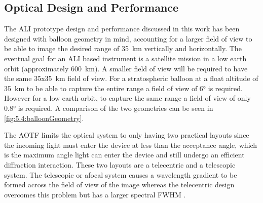 \documentclass[12pt]{article}
\begin{document}
\subsection{Optical Design and Performance}

The ALI prototype design and performance discussed in this work has been designed with balloon geometry in mind, accounting for a larger field of view to be able to image the 
desired range of 35~km vertically and horizontally. The eventual goal for an ALI based instrument is a satellite mission in a low earth orbit (approximately 600~km). A smaller 
field of view will be required to have the same 35x35~km field of view. For a stratospheric balloon at a float altitude of 35~km to be able to capture the entire range a field 
of view of 6\si{\degree} is required. However for a low earth orbit, to capture the same range a field of view of only 0.8\si{\degree} is required. A comparison of the two 
geometries can be seen in \autoref{fig:5.4:balloonGeometry}.

The AOTF limits the optical system to only having two practical layouts since the incoming light must enter the device at less than the acceptance angle, which is the maximum 
angle light can enter the device and still undergo an efficient diffraction interaction. These two layouts are a telecentric and a telescopic system. The telescopic or afocal 
system causes a wavelength gradient to be formed across the field of view of the image whereas the telecentric design overcomes this problem but has a larger spectral FWHM 
\citep{Suhre2004}.
\end{document}
